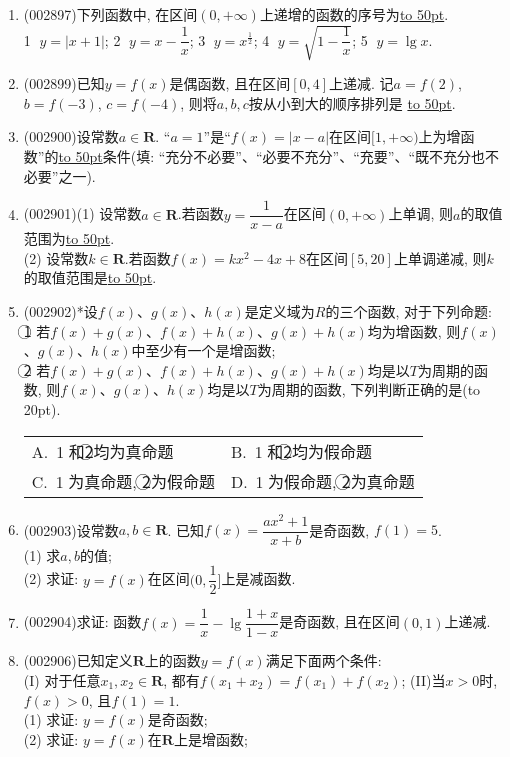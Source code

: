 \documentclass[10pt,a4paper]{article}
\newcommand{\blank}[1]{\underline{\hbox to #1pt{}}}
\newcommand{\bracket}[1]{(\hbox to #1pt{})}
\newcommand{\twoch}[4]{\par\begin{tabular}{p{.46\textwidth}p{.46\textwidth}}
A.~#1& B.~#2\\
C.~#3& D.~#4
\end{tabular}}
\begin{document}
\begin{enumerate}[1.]
\item {\tiny (002897)}下列函数中, 在区间$(0 ,+\infty)$上递增的函数的序号为\blank{50}.\\
\textcircled{1} $y=|x+1|$;  \textcircled{2} $y=x-\dfrac 1x$;    \textcircled{3} $y={x^{\frac 12}}$;    \textcircled{4} $y=\sqrt{1-\dfrac 1x}$; \textcircled{5} $y=\lg x$.
\item {\tiny (002899)}已知$y=f(x)$是偶函数, 且在区间$[0,4]$上递减. 记$a=f(2)$, $b=f(-3)$, $c=f(-4)$, 则将$a,b,c$按从小到大的顺序排列是	\blank{50}.
\item {\tiny (002900)}设常数$a\in \mathbf{R}$. ``$a=1$''是``$f(x)=|x-a|$在区间$[1, +\infty)$上为增函数''的\blank{50}条件(填: ``充分不必要''、``必要不充分''、``充要''、``既不充分也不必要''之一).
\item {\tiny (002901)}(1) 设常数$a\in \mathbf{R}$.若函数$y=\dfrac 1{x-a}$在区间$(0,+\infty)$上单调, 则$a$的取值范围为\blank{50}.\\
(2) 设常数$k\in \mathbf{R}$.若函数$f(x)=kx^2-4x+8$在区间$[5,20]$上单调递减, 则$k$的取值范围是\blank{50}.
\item {\tiny (002902)}*设$f(x)$、$g(x)$、$h(x)$是定义域为$R$的三个函数, 对于下列命题:\\
\textcircled{1} 若$f(x)+g(x)$、$f(x)+h(x)$、$g(x)+h(x)$均为增函数, 则$f(x)$、$g(x)$、$h(x)$中至少有一个是增函数;\\
\textcircled{2} 若$f(x)+g(x)$、$f(x)+h(x)$、$g(x)+h(x)$均是以$T$为周期的函数, 则$f(x)$、$g(x)$、$h(x)$均是以$T$为周期的函数, 下列判断正确的是\bracket{20}.
\twoch{\textcircled{1}和\textcircled{2}均为真命题}{\textcircled{1}和\textcircled{2}均为假命题}{\textcircled{1}为真命题, \textcircled{2}为假命题}{\textcircled{1}为假命题, \textcircled{2}为真命题}
\item {\tiny (002903)}设常数$a,b\in \mathbf{R}$. 已知$f(x)=\dfrac{ax^2+1}{x+b}$是奇函数, $f(1)=5$.\\
(1) 求$a,b$的值;\\
(2) 求证: $y=f(x)$在区间$(0,\dfrac 12]$上是减函数.
\item {\tiny (002904)}求证: 函数$f(x)=\dfrac 1x-\lg\dfrac{1+x}{1-x}$是奇函数, 且在区间$(0,1)$上递减.
\item {\tiny (002906)}已知定义$\mathbf{R}$上的函数$y=f(x)$满足下面两个条件:\\
(I) 对于任意$x_1,x_2\in \mathbf{R}$, 都有$f(x_1+x_2)=f(x_1)+f(x_2)$; (II)当$x>0$时, $f(x)>0$, 且$f(1)=1$.\\
(1) 求证: $y=f(x)$是奇函数;\\
(2) 求证: $y=f(x)$在$\mathbf{R}$上是增函数;\\

\end{enumerate}
\end{document}
